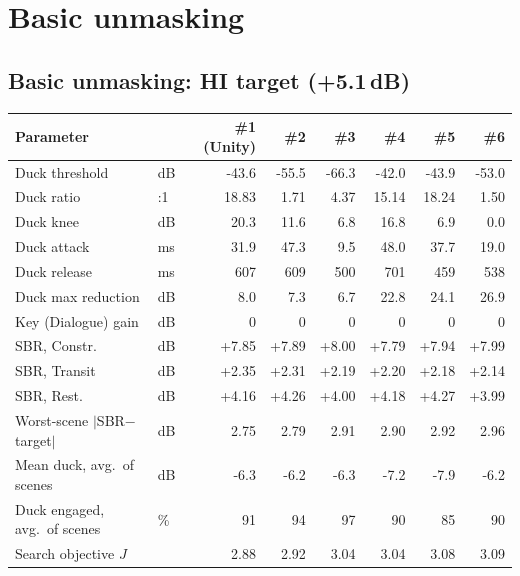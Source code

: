 \documentclass[11pt]{article}
\begin{document}
\clearpage

\section{Basic unmasking}

\subsection*{Basic unmasking: HI target (+5.1\,dB)}
\begin{table}[H]\centering\scriptsize
\begin{tabular}{@{}l l rrrrrr@{}}
\toprule
\textbf{Parameter} & & \textbf{\#1} \textbf{(Unity)} & \textbf{\#2} & \textbf{\#3} & \textbf{\#4} & \textbf{\#5} & \textbf{\#6} \\
\midrule
Duck threshold & dB & -43.6 & -55.5 & -66.3 & -42.0 & -43.9 & -53.0 \\
Duck ratio & :1 & 18.83 & 1.71 & 4.37 & 15.14 & 18.24 & 1.50 \\
Duck knee & dB & 20.3 & 11.6 & 6.8 & 16.8 & 6.9 & 0.0 \\
Duck attack & ms & 31.9 & 47.3 & 9.5 & 48.0 & 37.7 & 19.0 \\
Duck release & ms & 607 & 609 & 500 & 701 & 459 & 538 \\
Duck max reduction & dB & 8.0 & 7.3 & 6.7 & 22.8 & 24.1 & 26.9 \\
Key (Dialogue) gain & dB & 0 & 0 & 0 & 0 & 0 & 0 \\
\midrule
SBR, Constr. & dB & +7.85 & +7.89 & +8.00 & +7.79 & +7.94 & +7.99 \\
SBR, Transit & dB & +2.35 & +2.31 & +2.19 & +2.20 & +2.18 & +2.14 \\
SBR, Rest. & dB & +4.16 & +4.26 & +4.00 & +4.18 & +4.27 & +3.99 \\
Worst-scene $|$SBR$-$target$|$ & dB & 2.75 & 2.79 & 2.91 & 2.90 & 2.92 & 2.96 \\
Mean duck, avg.\ of scenes & dB & -6.3 & -6.2 & -6.3 & -7.2 & -7.9 & -6.2 \\
Duck engaged, avg.\ of scenes & \% & 91 & 94 & 97 & 90 & 85 & 90 \\
Search objective $J$ & & 2.88 & 2.92 & 3.04 & 3.04 & 3.08 & 3.09 \\
\bottomrule
\end{tabular}
\end{table}
\end{document}
